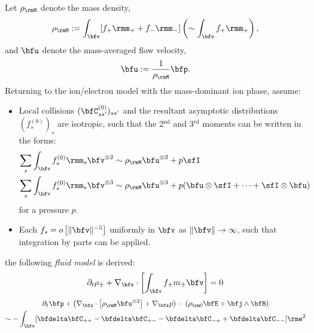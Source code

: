     Let $\rho_{\rmM}$ denote the mass density,
    \begin{equation}
        \rho_{\rmM}  :=  \int_{\bfv}[f_{+}\rmm_{+} + f_{-}\rmm_{-}]  \left(\sim  \int_{\bfv}f_{+}\rmm_{+}\right),
    \end{equation}
    and $\bfu$ denote the mass-averaged flow velocity,
    \begin{equation}
        \bfu  :=  \frac{1}{\rho_{\rmM}}\bfp.
    \end{equation}
    Returning to the ion/electron model with the mass-dominant ion phase, assume:
    \begin{itemize}
        \item  Local collisions $(\bfC_{ss'}^{(0)})_{ss'}$ and the resultant asymptotic distributions $(f_{s}^{(0)})_{s}$ are isotropic, such that the 2$^{\text{nd}}$ and 3$^{\text{rd}}$ moments can be written in the forms:
        \begin{align}
            \sum_{s}\int_{\bfv}f_{s}^{(0)}\rmm_{s}\bfv^{\otimes 2}  &\sim  \rho_{\rmM}\bfu^{\otimes 2} + p\sfI  \label{eqn:isotropic 2nd moment}  \\
            \sum_{s}\int_{\bfv}f_{s}^{(0)}\rmm_{s}\bfv^{\otimes 3}  &\sim  \rho_{\rmM}\bfu^{\otimes 3} + p(\bfu\otimes\sfI + \cdots + \sfI\otimes\bfu)  \label{eqn:isotropic 3rd moment}
        \end{align}
        for a pressure $p$. 
        \item  Each $f_{s}  =  o\left[\|\bfv\|^{- 5}\right]$ uniformly in $\bfv$ as $\|\bfv\|  \rightarrow  \infty$, such that integration by parts can be applied.
    \end{itemize}
    the following \emph{fluid model} is derived:
    \begin{equation}
        \partial_{t}\rho_{\pm} + \nabla_{\bfx}\cdot\left[\int_{\bfv}f_{\pm}m_{\pm}\bfv\right]  =  0  \label{eqn:phase mass conservation introduction}
    \end{equation}
    \vspace{-20pt}
    \begin{multline}
        \partial_{t}\bfp + \left(\nabla_{\bfx}\cdot\left[\rho_{\rmM}\bfu^{\otimes 2}\right] + \nabla_{\bfx}p\right) - \left(\rho_{\rmC}\bfE + \bfj\wedge\bfB\right)  \\
        \sim  - \int_{\bfv}[\bfdelta\bfC_{++} - \bfdelta\bfC_{+-} - \bfdelta\bfC_{-+} + \bfdelta\bfC_{--}]\rme^{2}
    \end{multline}
